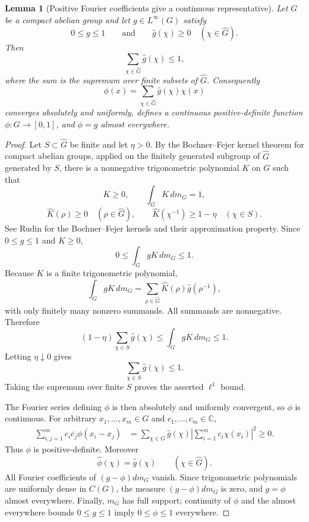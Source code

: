 \documentclass[11pt]{article}
\numberwithin{equation}{section}
\newtheorem{lemma}[theorem]{Lemma}
\newcommand{\C}{\mathbb C}
\newcommand{\1}{\mathbf 1}
\begin{document}
\begin{lemma}[Positive Fourier coefficients give a continuous representative]
\label{lem:linfty-continuous-pd}
Let \(G\) be a compact abelian group and let \(g\in L^\infty(G)\) satisfy
\[
        0\le g\le1
        \qquad\text{and}\qquad
        \widehat g(\chi)\ge0
        \quad(\chi\in\widehat G).
\]
Then
\[
        \sum_{\chi\in\widehat G}\widehat g(\chi)\le1,
\]
where the sum is the supremum over finite subsets of \(\widehat G\).
Consequently
\[
        \phi(x)=\sum_{\chi\in\widehat G}\widehat g(\chi)\chi(x)
\]
converges absolutely and uniformly, defines a continuous positive-definite
function \(\phi:G\to[0,1]\), and \(\phi=g\) almost everywhere.
\end{lemma}

\begin{proof}
Let \(S\subset\widehat G\) be finite and let \(\eta>0\).  By the
Bochner--Fejer kernel theorem for compact abelian groups, applied on the
finitely generated subgroup of \(\widehat G\) generated by \(S\), there is
a nonnegative trigonometric polynomial \(K\) on \(G\) such that
\[
        K\ge0,
        \qquad
        \int_G K\,dm_G=1,
\]
\[
        \widehat K(\rho)\ge0
        \quad(\rho\in\widehat G),
        \qquad
        \widehat K(\chi^{-1})\ge1-\eta
        \quad(\chi\in S).
\]
See Rudin \cite[Chapter 1, Sections 1.4--1.5]{Rudin} for the
Bochner--Fejer kernels and their approximation property.  Since
\(0\le g\le1\) and \(K\ge0\),
\[
        0\le\int_G gK\,dm_G\le1.
\]
Because \(K\) is a finite trigonometric polynomial,
\[
        \int_G gK\,dm_G
        =
        \sum_{\rho\in\widehat G}
        \widehat K(\rho)\widehat g(\rho^{-1}),
\]
with only finitely many nonzero summands.  All summands are nonnegative.
Therefore
\[
        (1-\eta)\sum_{\chi\in S}\widehat g(\chi)
        \le
        \int_G gK\,dm_G
        \le1.
\]
Letting \(\eta\downarrow0\) gives
\[
        \sum_{\chi\in S}\widehat g(\chi)\le1.
\]
Taking the supremum over finite \(S\) proves the asserted \(\ell^1\)
bound.

The Fourier series defining \(\phi\) is then absolutely and uniformly
convergent, so \(\phi\) is continuous.  For arbitrary
\(x_1,\ldots,x_m\in G\) and \(c_1,\ldots,c_m\in\C\),
\[
\begin{aligned}
        \sum_{i,j=1}^m c_i\overline{c_j}\phi(x_i-x_j)
        &=
        \sum_{\chi\in\widehat G}
        \widehat g(\chi)
        \left|
        \sum_{i=1}^m c_i\chi(x_i)
        \right|^2
        \ge0.
\end{aligned}
\]
Thus \(\phi\) is positive-definite.  Moreover
\[
        \widehat\phi(\chi)=\widehat g(\chi)
        \qquad(\chi\in\widehat G).
\]
All Fourier coefficients of \((g-\phi)dm_G\) vanish.  Since trigonometric
polynomials are uniformly dense in \(C(G)\), the measure
\((g-\phi)dm_G\) is zero, and \(g=\phi\) almost everywhere.
Finally, \(m_G\) has full support; continuity of \(\phi\) and the almost
everywhere bounds \(0\le g\le1\) imply \(0\le\phi\le1\) everywhere.
\end{proof}
\end{document}
